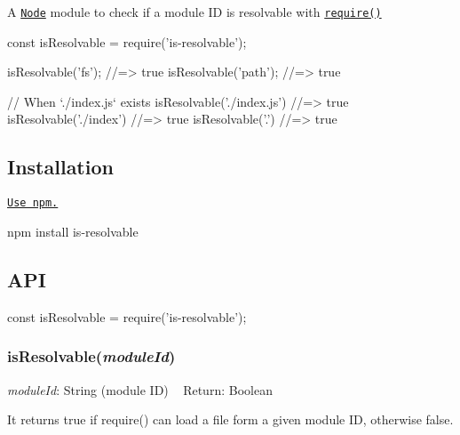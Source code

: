 \href{https://www.npmjs.com/package/is-resolvable}{\tt } \href{https://travis-ci.org/shinnn/is-resolvable}{\tt } \href{https://ci.appveyor.com/project/ShinnosukeWatanabe/is-resolvable}{\tt } \href{https://coveralls.io/r/shinnn/is-resolvable}{\tt } \href{https://david-dm.org/shinnn/is-resolvable}{\tt } \href{https://david-dm.org/shinnn/is-resolvable#info=devDependencies}{\tt }

A \href{https://nodejs.org/}{\tt Node} module to check if a module ID is resolvable with \href{https://nodejs.org/api/globals.html#globals_require}{\tt {\ttfamily require()}}


\begin{DoxyCode}
const isResolvable = require('is-resolvable');

isResolvable('fs'); //=> true
isResolvable('path'); //=> true

// When `./index.js` exists
isResolvable('./index.js') //=> true
isResolvable('./index') //=> true
isResolvable('.') //=> true
\end{DoxyCode}


\subsection*{Installation}

\href{https://docs.npmjs.com/cli/install}{\tt Use npm.}


\begin{DoxyCode}
npm install is-resolvable
\end{DoxyCode}


\subsection*{A\+PI}


\begin{DoxyCode}
const isResolvable = require('is-resolvable');
\end{DoxyCode}


\subsubsection*{is\+Resolvable({\itshape module\+Id})}

{\itshape module\+Id}\+: {\ttfamily String} (module ID) ~\newline
Return\+: {\ttfamily Boolean}

It returns {\ttfamily true} if {\ttfamily require()} can load a file form a given module ID, otherwise {\ttfamily false}.


